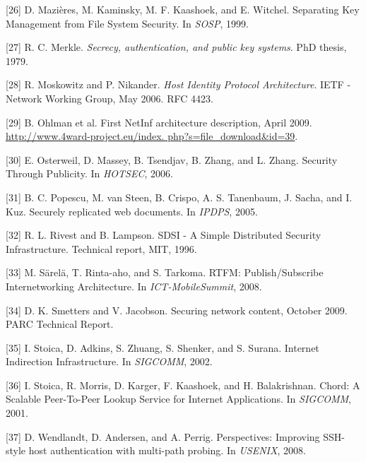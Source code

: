 [26] D. Mazières, M. Kaminsky, M. F. Kaashoek, and E. Witchel.
Separating Key Management from File System Security. In
\emph{SOSP}, 1999.

[27] R. C. Merkle. \emph{Secrecy, authentication, and public key
systems}. PhD thesis, 1979.

[28] R. Moskowitz and P. Nikander. \emph{Host Identity Protocol
Architecture}. IETF - Network Working Group, May 2006.
RFC 4423.

[29] B. Ohlman et al. First NetInf architecture description, April
2009. \url{http://www.4ward-project.eu/index.
php?s=file_download&id=39}.

[30] E. Osterweil, D. Massey, B. Tsendjav, B. Zhang, and
L. Zhang. Security Through Publicity. In \emph{HOTSEC}, 2006.

[31] B. C. Popescu, M. van Steen, B. Crispo, A. S. Tanenbaum,
J. Sacha, and I. Kuz. Securely replicated web documents. In
\emph{IPDPS}, 2005.

[32] R. L. Rivest and B. Lampson. SDSI - A Simple Distributed
Security Infrastructure. Technical report, MIT, 1996.

[33] M. Särelä, T. Rinta-aho, and S. Tarkoma. RTFM:
Publish/Subscribe Internetworking Architecture. In
\emph{ICT-MobileSummit}, 2008.

[34] D. K. Smetters and V. Jacobson. Securing network content,
October 2009. PARC Technical Report.

[35] I. Stoica, D. Adkins, S. Zhuang, S. Shenker, and S. Surana.
Internet Indirection Infrastructure. In \emph{SIGCOMM}, 2002.

[36] I. Stoica, R. Morris, D. Karger, F. Kaashoek, and
H. Balakrishnan. Chord: A Scalable Peer-To-Peer Lookup
Service for Internet Applications. In \emph{SIGCOMM}, 2001.

[37] D. Wendlandt, D. Andersen, and A. Perrig. Perspectives: Improving SSH-style host authentication with multi-path
probing. In \emph{USENIX}, 2008.